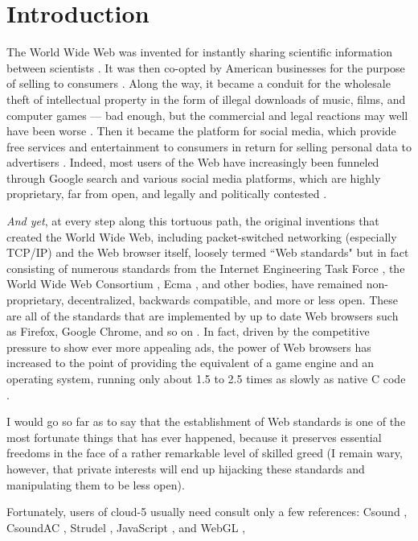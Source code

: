 \documentclass[runningheads,a4paper]{llncs}
\begin{document}
\section{Introduction}

The World Wide Web was invented for instantly sharing scientific information between scientists \cite{www}. It was then co-opted by American businesses for the purpose of selling to consumers \cite{gore}. Along the way, it became a conduit for the wholesale theft of intellectual property in the form of illegal downloads of music, films, and computer games --- bad enough, but the commercial and legal reactions may well have been worse \cite{freeculture}. Then it became the platform for social media, which provide free services and entertainment to consumers in return for selling personal data to advertisers \cite{socialmedia}. Indeed, most users of the Web have increasingly been funneled through Google search and various social media platforms, which are highly proprietary, far from open, and legally and politically contested \cite{surveillance}. 

\emph{And yet}, at every step along this tortuous path, the original inventions that created the World Wide Web, including packet-switched networking (especially TCP/IP) and the Web browser itself, loosely termed ``Web standards" but in fact consisting of numerous standards from the Internet Engineering Task Force \cite{ietf}, the World Wide Web Consortium \cite{w3c}, Ecma \cite{ecma}, and other bodies, have remained non-proprietary, decentralized, backwards compatible, and more or less open. These are all of the standards that are implemented by up to date Web browsers such as Firefox, Google Chrome, and so on \cite{html5test}. In fact, driven by the competitive pressure to show ever more appealing ads, the power of Web browsers has increased to the point of providing the equivalent of a game engine and an operating system, running only about 1.5 to 2.5  times as slowly as native C code \cite{wasmspeed}. 

I would go so far as to say that the establishment of Web standards is one of the most fortunate things that has ever happened, because it preserves essential freedoms in the face of a rather remarkable level of skilled greed (I remain wary, however, that private interests will end up hijacking these standards and manipulating them to be less open).

Fortunately, users of cloud-5 usually need consult only a few references: Csound \cite{csoundreference} \cite{csoundapireference}, CsoundAC \cite{csoundacreference}, Strudel \cite{strudel}, JavaScript \cite{javascriptreference}, and WebGL \cite{webglreference}, 
\end{document}
